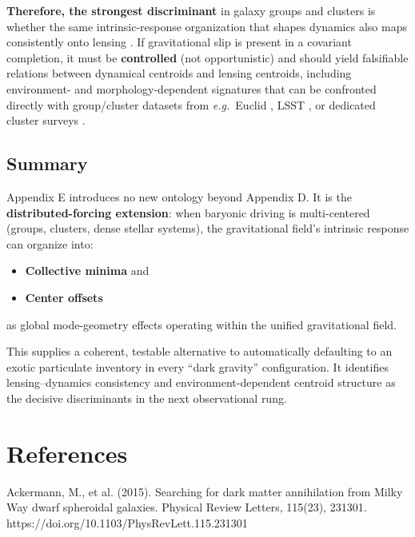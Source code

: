 \documentclass[11pt]{article}
\begin{document}
\textbf{Therefore, the strongest discriminant} in galaxy groups and clusters is whether the 
same intrinsic-response organization that shapes dynamics also maps consistently onto lensing \citep{Clowe2006}. 
If gravitational slip is present in a covariant completion, it must be \textbf{controlled} 
(not opportunistic) and should yield falsifiable relations between dynamical centroids and 
lensing centroids, including environment- and morphology-dependent signatures that can be 
confronted directly with group/cluster datasets from \textit{e.g.}\ Euclid \citep{Euclid2025}, LSST \citep{Ivezic2019}, or 
dedicated cluster surveys \citep{MAST2019}.

\subsection{Summary}\label{e.8-summary}

Appendix E introduces no new ontology beyond Appendix D. It is the \textbf{distributed-forcing 
extension}: when baryonic driving is multi-centered (groups, clusters, dense stellar systems), 
the gravitational field's intrinsic response can organize into:
\begin{itemize}
  \item \textbf{Collective minima} and
  \item \textbf{Center offsets}
\end{itemize}
as global mode-geometry effects operating within the unified gravitational field.

This supplies a coherent, testable alternative to automatically defaulting to an exotic 
particulate inventory in every ``dark gravity'' configuration. It identifies lensing--dynamics 
consistency and environment-dependent centroid structure as the decisive discriminants in the 
next observational rung.


\section{References}\label{}




\iffalse %

Ackermann, M., et al. (2015). Searching for dark matter annihilation from Milky Way dwarf spheroidal galaxies. Physical Review Letters, 115(23), 231301. https://doi.org/10.1103/PhysRevLett.115.231301
\end{document}
